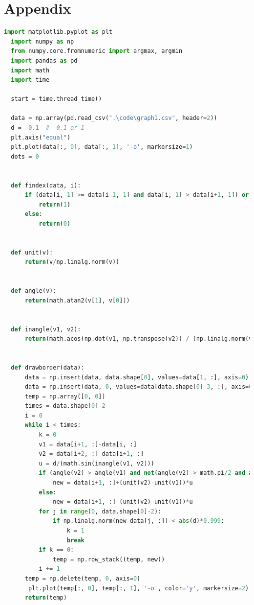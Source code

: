 \documentclass{apmcmthesis}
\begin{document}
\section{Appendix}
\begin{lstlisting}[language=Python,caption={The python Source code of contour parallel hatch}]
  import matplotlib.pyplot as plt 
  import numpy as np
  from numpy.core.fromnumeric import argmax, argmin
  import pandas as pd
  import math
  import time
  
  start = time.thread_time()
  
  data = np.array(pd.read_csv(".\code\graph1.csv", header=2))   
  d = -0.1  # -0.1 or 1
  plt.axis("equal")
  plt.plot(data[:, 0], data[:, 1], '-o', markersize=1)
  dots = 0
  
  
  def findex(data, i):   
      if (data[i, 1] >= data[i-1, 1] and data[i, 1] > data[i+1, 1]) or (data[i, 1] <= data[i-1, 1] and data[i, 1] < data[i+1, 1]):
          return(1)
      else:
          return(0)
  
  
  def unit(v):   
      return(v/np.linalg.norm(v))
  
  
  def angle(v):   
      return(math.atan2(v[1], v[0]))
  
  
  def inangle(v1, v2):   
      return(math.acos(np.dot(v1, np.transpose(v2)) / (np.linalg.norm(v1)*np.linalg.norm(v2))))
  
  
  def drawborder(data):   
      data = np.insert(data, data.shape[0], values=data[1, :], axis=0)
      data = np.insert(data, 0, values=data[data.shape[0]-3, :], axis=0)
      temp = np.array([0, 0])
      times = data.shape[0]-2
      i = 0
      while i < times:
          k = 0
          v1 = data[i+1, :]-data[i, :]
          v2 = data[i+2, :]-data[i+1, :]
          u = d/(math.sin(inangle(v1, v2)))
          if (angle(v2) > angle(v1) and not(angle(v2) > math.pi/2 and angle(v1) < -math.pi/2)) or (angle(v2) < -math.pi/2 and angle(v1) > math.pi/2):
              new = data[i+1, :]+(unit(v2)-unit(v1))*u
          else:
              new = data[i+1, :]-(unit(v2)-unit(v1))*u
          for j in range(0, data.shape[0]-2):
              if np.linalg.norm(new-data[j, :]) < abs(d)*0.999:
                  k = 1
                  break
          if k == 0:
              temp = np.row_stack((temp, new))
          i += 1
      temp = np.delete(temp, 0, axis=0)
       plt.plot(temp[:, 0], temp[:, 1], '-o', color='y', markersize=2)
      return(temp)
  

\end{lstlisting}
\end{document}
